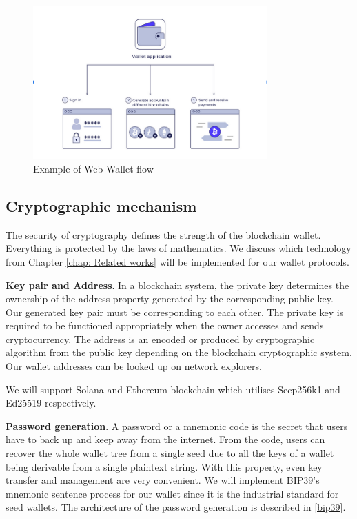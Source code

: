 \begin{figure}[!ht]
    \centering
    \includegraphics[width=0.8\textwidth]{images/webwallet.png}
    \caption[Example of Web Wallet flow]{Example of Web Wallet flow}
    \label{fig:webwallet}
\end{figure}

\subsection{Cryptographic mechanism}
The security of cryptography defines the strength of the blockchain wallet. Everything is protected by the laws of mathematics. We discuss which technology from Chapter \ref{chap: Related works} will be implemented for our wallet protocols.

\bigskip
{\textbf{Key pair and Address}}. In a blockchain system, the private key determines the ownership of the address property generated by the corresponding public key. Our generated key pair must be corresponding to each other. The private key is required to be functioned appropriately when the owner accesses and sends cryptocurrency. The address is an encoded or produced by cryptographic algorithm from the public key depending on the blockchain cryptographic system. Our wallet addresses can be looked up on network explorers.

We will support Solana and Ethereum blockchain which utilises Secp256k1 and Ed25519 respectively.

\bigskip
{\textbf{Password generation}}. A password or a mnemonic code is the secret that users have to back up and keep away from the internet. From the code, users can recover the whole wallet tree from a single seed due to all the keys of a wallet being derivable from a single plaintext string. With this property, even key transfer and management are very convenient. We will implement BIP39's mnemonic sentence process for our wallet since it is the industrial standard for seed wallets.
The architecture of the password generation is described in \autoref{bip39}.


